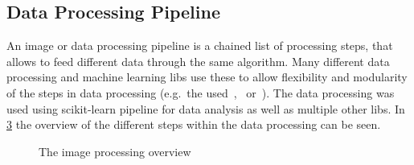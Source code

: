 \documentclass[12pt,a4paper, english,twoside]{article}
\begin{document}
    \subsection{Data Processing Pipeline}
      An image or data processing pipeline is a chained list of processing steps, that allows to feed different data through the same algorithm. 
      Many different data processing and machine learning \glspl{lib} use these to allow flexibility and modularity of the steps in data processing (e.g.\ the used~\cite{scikit-learn},~\cite{keras} or~\cite{gluon}). 
      The data processing was used using scikit-learn pipeline for data analysis as well as multiple other \glspl{lib}. 
      In \cref{fig:pipeline} the overview of the different steps within the data processing can be seen.
      \begin{figure}[!htbp]
         \begin{subfigure}[b]{0.50\textwidth}
           
           \label{fig:pipelineTraining}
         \end{subfigure}
         \begin{subfigure}[b]{0.50\textwidth}
           
           \label{fig:pipelineTrained}
         \end{subfigure}
         \caption{The image processing overview\label{fig:pipeline}}
       \end{figure}
  \newpage
\end{document}
